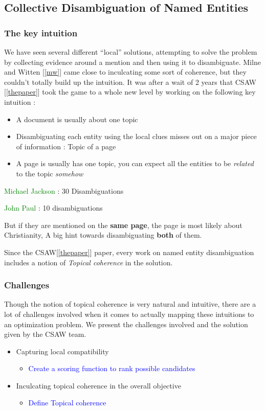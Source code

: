 \subsection{Collective Disambiguation of Named Entities}
\subsubsection{The key intuition}
We have seen several different ``local'' solutions, attempting to solve the problem by collecting evidence
around a mention and then using it to disambiguate. Milne and Witten [\ref{mw}] 
came close to inculcating some sort of coherence, but they couldn't totally build up the intuition. It was after a wait of 2 years that CSAW [\ref{thepaper}] took the game 
to a whole new level by working on the following key intuition :	
\begin{itemize}
  \item A document is usually about one topic \bigskip
  \item Disambiguating each entity using the local clues misses out on a major piece of information : Topic of a page \bigskip
  \item A page is usually has one topic, you can expect all the entities to be \emph{related} to the topic \emph{somehow} \bigskip
  \end{itemize}
  \textcolor{green}{Michael Jackson} : 30 Disambiguations 
  
 \textcolor{green}{John Paul} : 10 disambiguations 
 
 
 
  But if they are mentioned on the \textbf{same page}, the page is most likely about Christianity,
  A big hint towards disambiguating \textbf{both} of them.
  
Since the CSAW[\ref{thepaper}] paper, every work on named entity disambiguation includes a 
notion of \emph{Topical coherence} in the solution. 

\subsubsection{Challenges}
Though the notion of topical coherence is very natural and intuitive, there are 
a lot of challenges involved when it comes to actually mapping these intuitions to an optimization
problem.
We present the challenges involved and the solution given by the CSAW team.
 \begin{itemize}
  \item Capturing local compatibility
  \begin{itemize}
   \item \textcolor{blue}{Create a scoring function to rank possible candidates}
  \end{itemize}

  \item Inculcating topical coherence in the overall objective

  \begin{itemize}
   \item \textcolor{blue}{Define Topical coherence}
  \end{itemize}

  \end{itemize}

